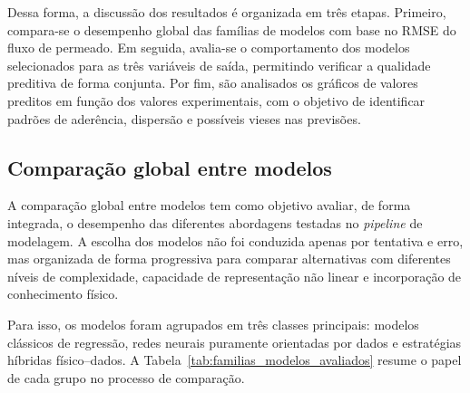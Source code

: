 Dessa forma, a discussão dos resultados é organizada em três etapas. Primeiro, compara-se o desempenho global das famílias de modelos com base no RMSE do fluxo de permeado. Em seguida, avalia-se o comportamento dos modelos selecionados para as três variáveis de saída, permitindo verificar a qualidade preditiva de forma conjunta. Por fim, são analisados os gráficos de valores preditos em função dos valores experimentais, com o objetivo de identificar padrões de aderência, dispersão e possíveis vieses nas previsões.
\subsection{Comparação global entre modelos}

A comparação global entre modelos tem como objetivo avaliar, de forma integrada, o desempenho das diferentes abordagens testadas no \textit{pipeline} de modelagem. A escolha dos modelos não foi conduzida apenas por tentativa e erro, mas organizada de forma progressiva para comparar alternativas com diferentes níveis de complexidade, capacidade de representação não linear e incorporação de conhecimento físico.

Para isso, os modelos foram agrupados em três classes principais: modelos clássicos de regressão, redes neurais puramente orientadas por dados e estratégias híbridas físico--dados. A Tabela~\ref{tab:familias_modelos_avaliados} resume o papel de cada grupo no processo de comparação.

